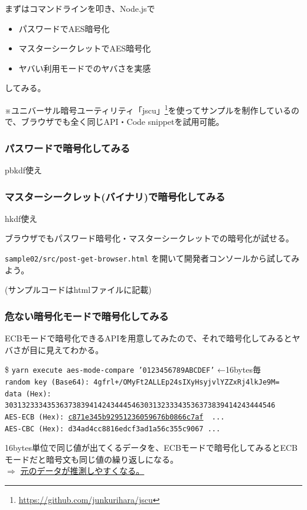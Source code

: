 \documentclass[12pt,dvipdfmx]{beamer}
\begin{document}
\begin{frame}
まずはコマンドラインを叩き、Node.jsで
\begin{itemize}
 \item パスワードでAES暗号化
 \item マスターシークレットでAES暗号化
 \item ヤバい利用モードでのヤバさを実感
\end{itemize}
してみる。

\vspace{2ex}

※ユニバーサル暗号ユーティリティ「jscu」\footnote[frame]{\url{https://github.com/junkurihara/jscu}}を使ってサンプルを制作しているので、\alert{ブラウザでも全く同じAPI・Code snippetを試用可能。}
\end{frame}

\begin{frame}
\frametitle{パスワードで暗号化してみる}
pbkdf使え
\end{frame}

\begin{frame}
\frametitle{マスターシークレット(バイナリ)で暗号化してみる}
hkdf使え
\end{frame}

\begin{frame}
ブラウザでもパスワード暗号化・マスターシークレットでの暗号化が試せる。

\vspace{1ex}

\texttt{sample02/src/post-get-browser.html} を開いて開発者コンソールから試してみよう。

\vspace{1ex}

(サンプルコードはhtmlファイルに記載)
\end{frame}

\begin{frame}
\frametitle{危ない暗号化モードで暗号化してみる}
ECBモードで暗号化できるAPIを用意してみたので、それで暗号化してみるとヤバさが目に見えてわかる。

\begin{exampleblock}{}
\scriptsize
\$ \texttt{yarn execute aes-mode-compare '\alert{0123456789ABCDEF}'} ←16bytes毎\\
\texttt{random key (Base64): 4gfrl+/OMyFt2ALLEp24sIXyHsyjvlYZZxRj4lkJe9M=}\\
\texttt{data (Hex): 3031323334353637383941424344454630313233343536373839414243444546}\\
\texttt{AES-ECB (Hex): \underline{\alert{c871e345b92951236059676b0866c7af}} \underline{} ...}\\
\texttt{AES-CBC (Hex): \alert{d34ad4cc8816edcf3ad1a56c355c9067}  ...}
\end{exampleblock}

16bytes単位で同じ値が出てくるデータを、ECBモードで暗号化してみると\alert{ECBモードだと暗号文も同じ値の繰り返しになる}。\\
$\Rightarrow$ \underline{元のデータが推測しやすくなる。}

\end{frame}
\end{document}
